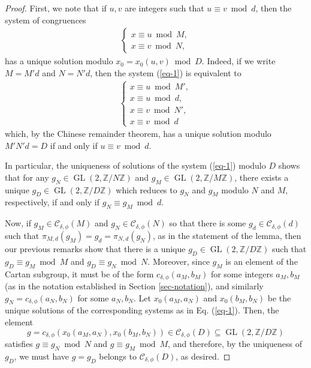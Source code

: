 \documentclass[10pt,a4paper]{amsart}
\newcommand{\GL}{\operatorname{GL}}
\newcommand{\Z}{\mathbb{Z}}
\begin{document}
\begin{proof} First, we note that if $u,v$ are integers such that $u\equiv v \bmod d$, then the system of congruences 
	\begin{align}\label{eq-1} \begin{cases}
		x\equiv u \bmod M,\\
		x\equiv v \bmod N,
	\end{cases}\end{align} 
	has a unique solution modulo $x_0=x_0(u,v)\bmod D$. Indeed, if we write $M=M'd$ and $N=N'd$, then the system (\ref{eq-1}) is equivalent to 
		\begin{align}\label{eq-2} \begin{cases}
			x\equiv u \bmod M',\\
			x\equiv u \bmod d,\\
			x\equiv v \bmod N',\\
			x\equiv v \bmod d
	\end{cases}\end{align}
which, by the Chinese remainder theorem, has a unique solution modulo $M'N'd = D$ if and only if $u\equiv v \bmod d$. 

In particular, the uniqueness of solutions of the system (\ref{eq-1}) modulo $D$ shows that for any $g_N \in \GL(2, \Z/N\Z)$ and $g_M\in \GL(2, \Z/M\Z)$, there exists a unique $g_D \in \GL(2,\Z/D\Z)$ which reduces to $g_N$ and $g_M$ modulo $N$ and $M$, respectively, if and only if $g_N\equiv g_M \bmod d$.

Now, if  $g_{M} \in \mathcal{C}_{\delta, \phi}(M)$ and $g_{N} \in \mathcal{C}_{\delta, \phi}(N)$ so that there is some $g_d \in \mathcal{C}_{\delta, \phi}(d)$ such that $\pi_{M,d}(g_M) = g_d = \pi_{N,d}(g_N)$, as in the statement of the lemma, then our previous remarks show that there is a unique $g_D\in \GL(2,\Z/D\Z)$ such that $g_D\equiv g_M\bmod M$ and $g_D\equiv g_N\bmod N$. Moreover, since $g_M$ is an element of the Cartan subgroup, it must be of the form $c_{\delta,\phi}(a_M,b_M)$ for some integers $a_M,b_M$ (as in the notation established in Section \ref{sec-notation}), and similarly $g_N= c_{\delta,\phi}(a_N,b_N)$ for some $a_N,b_N$. Let $x_0(a_M,a_N)$ and $x_0(b_M,b_N)$ be the unique solutions of the corresponding systems as in Eq. (\ref{eq-1}).  Then, the element
$$g=c_{\delta,\phi}(x_0(a_M,a_N),x_0(b_M,b_N))\in  \mathcal{C}_{\delta, \phi}(D)\subseteq \GL(2,\Z/D\Z)$$
satisfies $g\equiv g_N \bmod N$ and $g\equiv g_M\bmod M$, and therefore, by the uniqueness of $g_D$, we must have $g=g_D$ belongs to $\mathcal{C}_{\delta, \phi}(D)$, as desired. 
 \end{proof}
\end{document}
